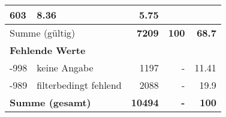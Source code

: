 \begin{longtable}{lXrrr}
       \num{603} &
       \num[round-mode=places,round-precision=2]{8,36} &
         \num[round-mode=places,round-precision=2]{5,75} \\
     \midrule
     \multicolumn{2}{l}{Summe (gültig)} &
       \textbf{\num{7209}} &
     \textbf{100} &
       \textbf{\num[round-mode=places,round-precision=2]{68,7}} \\
     \multicolumn{5}{l}{\textbf{Fehlende Werte}}\\
       -998 &
       keine Angabe &
         \num{1197} &
        - &
         \num[round-mode=places,round-precision=2]{11,41} \\
       -989 &
       filterbedingt fehlend &
         \num{2088} &
        - &
         \num[round-mode=places,round-precision=2]{19,9} \\
     \midrule
     \multicolumn{2}{l}{\textbf{Summe (gesamt)}} &
          \textbf{\num{10494}} &
        \textbf{-} &
        \textbf{100} \\
     \bottomrule
     \end{longtable}
     
